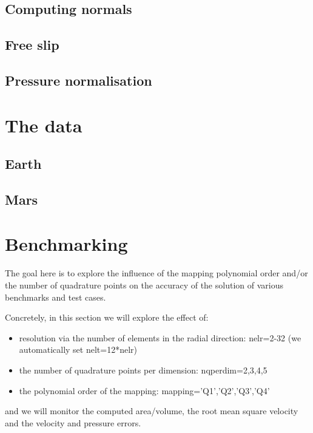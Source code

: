 \documentclass[a4paper,12pt]{article}
\newcommand{\python}{\color{darkgray} \sffamily }
\begin{document}
\subsection{Computing normals}

\subsection{Free slip}


\subsection{Pressure normalisation}





\newpage
\section{The data}

\subsection{Earth}


\subsection{Mars}


\newpage
\section{Benchmarking}



The goal here is to explore the influence of the mapping polynomial order and/or
the number of quadrature points on the accuracy of the solution of various benchmarks and test cases.

Concretely, in this section we will explore the effect of:
\begin{itemize}
\item resolution via the number of elements in the radial direction: {\python nelr=2-32} (we automatically set {\python nelt=12*nelr})
\item the number of quadrature points per dimension: {\python nqperdim=2,3,4,5}
\item the polynomial order of the mapping: {\python mapping='Q1','Q2','Q3','Q4'}
\end{itemize}
and we will monitor the computed area/volume, the root mean square velocity and the velocity and pressure errors.
\end{document}
